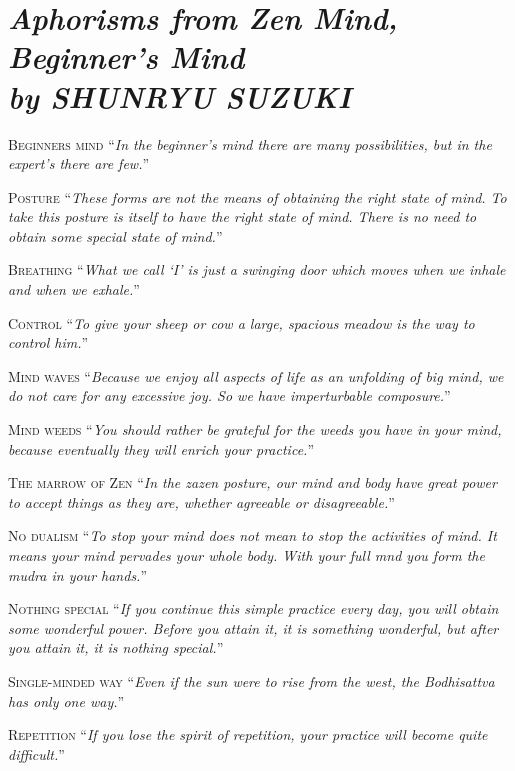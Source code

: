 \documentclass[14pt]{extarticle}
\newcommand{\aphor}[2]{
    \lettrine[lines=2, lraise=0.15]{#1}{#2}
}
\begin{document}
\section*{\LARGE\sffamily\slshape Aphorisms from Zen Mind, Beginner's Mind \\ {\large by SHUNRYU SUZUKI }}

\aphor{B}{eginners mind} \enquote{\textit{In the beginner's mind there are many possibilities, but in the expert's there are few.}}

\aphor{P}{osture} \enquote{\textit{These forms are not the means of obtaining the right state of mind. To take this posture is itself to have the right state of mind. There is no need to obtain some special state of mind.}}

\aphor{B}{reathing} \enquote{\textit{What we call \enquote{I} is just a swinging door which moves when we inhale and when we exhale.}}

\aphor{C}{ontrol} \enquote{\textit{To give your sheep or cow a large, spacious meadow is the way to control him.}}

\aphor{M}{ind waves} \enquote{\textit{Because we enjoy all aspects of life as an unfolding of big mind, we do not care for any excessive joy. So we have imperturbable composure.}}

\aphor{M}{ind weeds} \enquote{\textit{You should rather be grateful for the weeds you have in your mind, because eventually they will enrich your practice.}}


\aphor{T}{he marrow of Zen} \enquote{\textit{In the zazen posture, our mind and body have great power to accept things as they are, whether agreeable or disagreeable.}}


\aphor{N}{o dualism} \enquote{\textit{To stop your mind does not mean to stop the activities of mind. It means your mind pervades your whole body. With your full mnd you form the mudra in your hands.}}

\pagebreak

\aphor{N}{othing special} \enquote{\textit{If you continue this simple practice every day, you will obtain some wonderful power. Before you attain it, it is something wonderful, but after you attain it, it is nothing special.}}

\aphor{S}{ingle-minded way} \enquote{\textit{Even if the sun were to rise from the west, the Bodhisattva has only one way.}}

\aphor{R}{epetition} \enquote{\textit{If you lose the spirit of repetition, your practice will become quite difficult.}}
\end{document}
